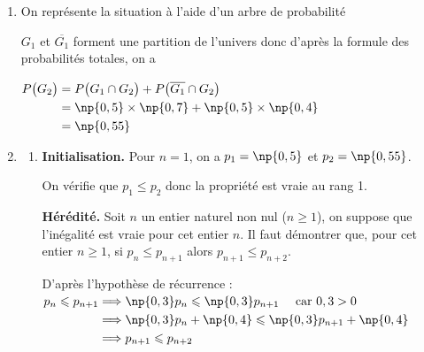 	\begin{enumerate}
		\item On représente la situation à l'aide d'un arbre de probabilité
		\begin{center}
		\end{center}
		$G_1$ et $\overline{G_1}$ forment une partition de l'univers donc d'après la formule des probabilités totales, on a

		$\aligned[t] P\big( G_2 \big) &= P \big( G_1 \cap G_2 \big) + P \big( \overline{G_1} \cap G_2 \big)\\
		& = \np{0,5} \times \np{0,7} + \np{0,5} \times \np{0,4}\\
		& = \np{0,55}
		\endaligned$

		\item \begin{enumerate}
			\item \textbf{Initialisation.} Pour $n=1$, on a $p_1=\np{0,5}$ et $p_2=\np{0,55}$.

			On vérifie que $p_1 \leqslant p_2$ donc la propriété est vraie au rang 1.

			\textbf{Hérédité.} Soit $n$ un entier naturel non nul ($n\geqslant 1$), on suppose que l'inégalité est vraie pour cet entier $n$.
			Il faut démontrer que, pour cet entier $n \geqslant 1$, si $p_n \leqslant p_{n+1}$ alors $p_{n+1} \leqslant p_{n+2}$.

			D'après l'hypothèse de récurrence :\quad
			$\aligned[t] p_n \leqslant p_{n+1}
			& \Longrightarrow \np{0,3} p_n \leqslant \np{0,3} p_{n+1}\quad \text{ car }0,3 > 0\\
			& \Longrightarrow \np{0,3} p_n +\np{0,4} \leqslant \np{0,3} p_{n+1} + \np{0,4} \\
			& \Longrightarrow p_{n+1} \leqslant p_{n+2}
			\endaligned$


\end{enumerate}
\end{enumerate}
